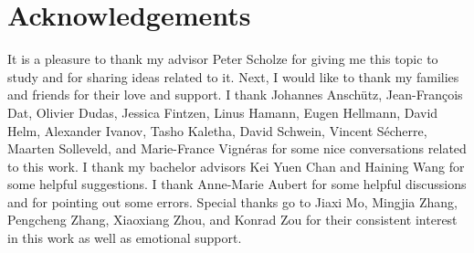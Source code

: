 \section{Acknowledgements}

It is a pleasure to thank my advisor Peter Scholze for giving me this topic to study and for sharing ideas related to it. Next, I would like to thank my families and friends for their love and support. I thank Johannes Anschütz, Jean-François Dat, Olivier Dudas, Jessica Fintzen, Linus Hamann, Eugen Hellmann, David Helm, Alexander Ivanov, Tasho Kaletha, David Schwein, Vincent Sécherre, Maarten Solleveld, and Marie-France Vignéras for some nice conversations related to this work. I thank my bachelor advisors Kei Yuen Chan and Haining Wang for some helpful suggestions. I thank Anne-Marie Aubert for some helpful discussions and for pointing out some errors. Special thanks go to Jiaxi Mo, Mingjia Zhang, Pengcheng Zhang, Xiaoxiang Zhou, and Konrad Zou for their consistent interest in this work as well as emotional support.
